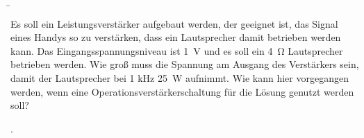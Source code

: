 \b{\begin{frame}
        Es soll ein Leistungsverstärker aufgebaut werden, der geeignet ist, das Signal eines Handys so zu verstärken, dass ein Lautsprecher damit betrieben werden kann.
        Das Eingangsspannungsniveau ist 1~V und es soll ein 4~$\mathrm{\Omega}$ Lautsprecher betrieben werden. 
        Wie groß muss die Spannung am Ausgang des Verstärkers sein, damit der Lautsprecher bei 1 kHz 25~W aufnimmt. 
        Wie kann hier vorgegangen werden, wenn eine Operationsverstärkerschaltung für die Lösung genutzt werden soll? \par
        .
\end{frame}}


